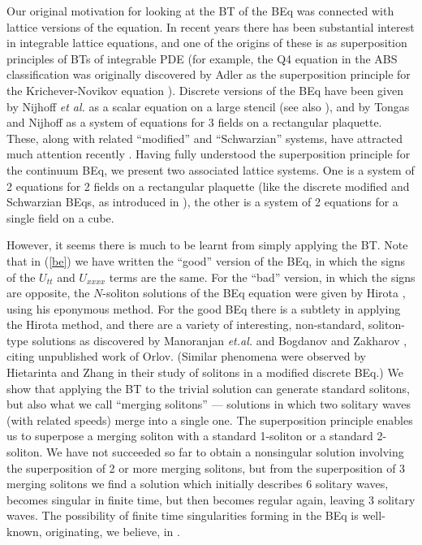 \documentclass[12pt]{article}
\begin{document}
Our original motivation  for looking at the BT of the BEq was connected with lattice versions of the equation.
In recent years there has been substantial interest in integrable lattice equations, and one of the origins of these is as
superposition principles of BTs of integrable PDE (for example, the Q4 equation in the ABS classification \cite{beq48}
was originally discovered by Adler as the superposition principle for the Krichever-Novikov equation \cite{beq47}).
Discrete versions of the BEq have been given by Nijhoff {\em et al.} \cite{beq53}  as a scalar equation on a large
stencil (see also \cite{beq54}), and by Tongas and Nijhoff \cite{beq28} as a system of equations for 3 fields on a
rectangular plaquette. These, along with related ``modified'' and ``Schwarzian''  systems,  have attracted much
attention recently \cite{beq56,beq14,beq25,beq26,beq27,beq24,beq31,beq57,beq55,beq22}. Having fully understood the
superposition principle for the continuum BEq, we present two associated lattice systems.
One is a system of 2 equations for 2 fields on a rectangular plaquette
(like the discrete modified and Schwarzian BEqs, as introduced in \cite{beq54,beq56}),  
the other is a system of 2 equations for a single field on a cube.

However, it seems there is much to be learnt from simply applying the BT.  Note that in (\ref{be})
we have written the ``good'' version of the BEq, in which the signs of the $U_{tt}$ and $U_{xxxx}$
terms are the same. For the ``bad'' version, in which the signs are opposite, the $N$-soliton solutions
of the BEq equation were given by Hirota \cite{beq34}, using his eponymous method. For the good BEq there is
a subtlety in applying the Hirota method, and there are a variety of interesting, non-standard, soliton-type solutions as
discovered by Manoranjan {\em et.al.} \cite{beq58,beq59} and 
Bogdanov and Zakharov \cite{beq11}, citing unpublished work of Orlov. (Similar phenomena were
observed by Hietarinta and Zhang \cite{beq27} in their study of solitons in a modified discrete BEq.)
We show that applying the BT to the trivial solution can generate standard solitons, but also what we 
call ``merging solitons'' --- solutions in which two solitary waves (with related speeds)
merge into a single one. The superposition principle enables us to superpose a merging soliton with a
standard 1-soliton or a standard 2-soliton. We have not succeeded so far to obtain a nonsingular solution 
involving the superposition of 2 or more merging solitons, but from the superposition of 3 merging solitons
we find a solution which initially describes 6 solitary waves, becomes singular in finite time, but then becomes regular
again, leaving 3 solitary waves. The possibility of finite time singularities forming in the BEq is well-known,
originating, we believe,  in \cite{Kalantarov}. 
\end{document}
